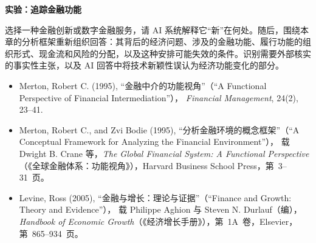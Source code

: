 
\textbf{实验：追踪金融功能}

选择一种金融创新或数字金融服务，请 AI 系统解释它“新”在何处。随后，围绕本章的分析框架重新组织回答：其背后的经济问题、涉及的金融功能、履行功能的组织形式、现金流和风险的分配，以及这种安排可能失效的条件。识别需要外部核实的事实性主张，以及 AI 回答中将技术新颖性误认为经济功能变化的部分。









\begin{itemize}

\item Merton, Robert C. (1995),
“金融中介的功能视角”（``A Functional Perspective of Financial Intermediation''），
\emph{Financial Management}, 24(2), 23--41.

\item Merton, Robert C., and Zvi Bodie (1995),
“分析金融环境的概念框架”（``A Conceptual Framework for Analyzing the Financial Environment''），
载 Dwight B. Crane 等，\emph{The Global Financial System: A Functional Perspective}（《全球金融体系：功能视角》），Harvard Business School Press，第~3--31~页。


\item Levine, Ross (2005),
“金融与增长：理论与证据”（``Finance and Growth: Theory and Evidence''），
载 Philippe Aghion 与 Steven N. Durlauf（编），\emph{Handbook of Economic Growth}（《经济增长手册》），第~1A~卷，Elsevier，第~865--934~页。



\end{itemize}

